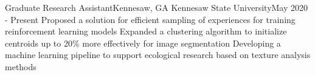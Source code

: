\resumeSubheading
{Graduate Research Assistant}{Kennesaw, GA}
{Kennesaw State University}{May 2020 - Present}
\resumeItemListStart
\resumeItem
{
    Proposed a solution for efficient sampling of experiences for training
    reinforcement learning models
}
\resumeItem
{
    Expanded a clustering algorithm to initialize centroids up to 20\% more effectively for
    image segmentation
}
\resumeItem
{
    Developing a machine learning pipeline to support ecological research based on
    texture analysis methods
}
\resumeItemListEnd



